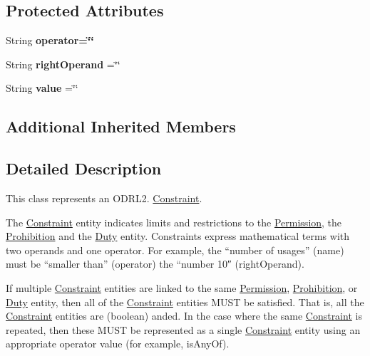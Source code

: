 \subsection*{Protected Attributes}
\begin{DoxyCompactItemize}
\item 
\hypertarget{classodrlmodel_1_1_constraint_af9fac4c8c0805d7eb1f6460f575067fc}{String {\bfseries operator=\char`\"{}\char`\"{}}}\label{classodrlmodel_1_1_constraint_af9fac4c8c0805d7eb1f6460f575067fc}

\item 
\hypertarget{classodrlmodel_1_1_constraint_abde5361d442cd655fb6c5aca3f911fe4}{String {\bfseries right\-Operand} =\char`\"{}\char`\"{}}\label{classodrlmodel_1_1_constraint_abde5361d442cd655fb6c5aca3f911fe4}

\item 
\hypertarget{classodrlmodel_1_1_constraint_a72bbef1fe62aff8d9701c44fa31ef55c}{String {\bfseries value} =\char`\"{}\char`\"{}}\label{classodrlmodel_1_1_constraint_a72bbef1fe62aff8d9701c44fa31ef55c}

\end{DoxyCompactItemize}
\subsection*{Additional Inherited Members}


\subsection{Detailed Description}
This class represents an O\-D\-R\-L2. \hyperlink{classodrlmodel_1_1_constraint}{Constraint}.

The \hyperlink{classodrlmodel_1_1_constraint}{Constraint} entity indicates limits and restrictions to the \hyperlink{classodrlmodel_1_1_permission}{Permission}, the \hyperlink{classodrlmodel_1_1_prohibition}{Prohibition} and the \hyperlink{classodrlmodel_1_1_duty}{Duty} entity. Constraints express mathematical terms with two operands and one operator. For example, the “number of usages” (name) must be “smaller than” (operator) the “number 10″ (right\-Operand).

If multiple \hyperlink{classodrlmodel_1_1_constraint}{Constraint} entities are linked to the same \hyperlink{classodrlmodel_1_1_permission}{Permission}, \hyperlink{classodrlmodel_1_1_prohibition}{Prohibition}, or \hyperlink{classodrlmodel_1_1_duty}{Duty} entity, then all of the \hyperlink{classodrlmodel_1_1_constraint}{Constraint} entities M\-U\-S\-T be satisfied. That is, all the \hyperlink{classodrlmodel_1_1_constraint}{Constraint} entities are (boolean) anded. In the case where the same \hyperlink{classodrlmodel_1_1_constraint}{Constraint} is repeated, then these M\-U\-S\-T be represented as a single \hyperlink{classodrlmodel_1_1_constraint}{Constraint} entity using an appropriate operator value (for example, is\-Any\-Of).

